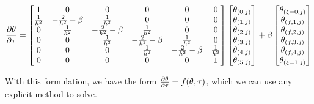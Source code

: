 \documentclass[10pt,letterpaper,notitlepage]{article}
\begin{document}
    \begin{adjustwidth}{-1cm}{-1cm}
        \begin{equation}
            \pdv{\theta}{\tau}
            =
            \begin{bmatrix}
                1 & 0 & 0 & 0 & 0 & 0 \\
                \frac{1}{h^2} & -\frac{2}{h^2} - \beta & \frac{1}{h^2} & 0 & 0 & 0 \\
                0& \frac{1}{h^2} & -\frac{2}{h^2} - \beta & \frac{1}{h^2} & 0 & 0 \\
                0&0&\frac{1}{h^2} & -\frac{2}{h^2} - \beta & \frac{1}{h^2} & 0\\
                0&0&0&\frac{1}{h^2} & -\frac{2}{h^2} - \beta & \frac{1}{h^2} \\
                0 & 0 & 0 & 0 & 0 & 1 
            \end{bmatrix}
            \begin{bmatrix}
                \theta_{(0, j)} \\
                \theta_{(1, j)} \\
                \theta_{(2, j)} \\
                \theta_{(3, j)} \\
                \theta_{(4, j)} \\
                \theta_{(5, j)}
            \end{bmatrix}
            +
            \beta
            \begin{bmatrix}
                \theta_{(\xi=0,j)} \\
                \theta_{(f,1,j)} \\
                \theta_{(f,2,j)} \\
                \theta_{(f,3,j)} \\
                \theta_{(f,4,j)} \\
                \theta_{(\xi=1,j)}
            \end{bmatrix}
            \label{eq:td_Axb}
        \end{equation}
    \end{adjustwidth}
    With this formulation, we have the form $\pdv{\theta}{\tau} = f(\theta, \tau)$, which we can use any explicit method to solve.
    
\end{document}
